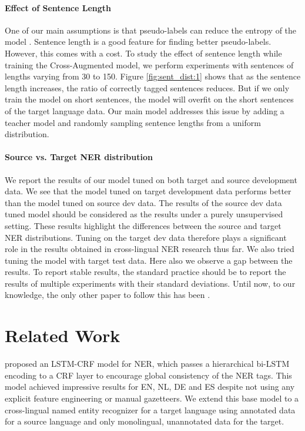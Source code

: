 \documentclass[letterpaper]{article} \usepackage{aaai20}  \usepackage{times}  \usepackage{helvet} \usepackage{courier}  \usepackage[hyphens]{url}  \usepackage{graphicx} \urlstyle{rm} \def\UrlFont{\rm}  \usepackage{graphicx}  \frenchspacing  \setlength{\pdfpagewidth}{8.5in}  \setlength{\pdfpageheight}{11in}
\newcommand{\citet}[1]{\citeauthor{#1} \shortcite{#1}}
\begin{document}
\paragraph{Effect of Sentence Length}
One of our main assumptions is that pseudo-labels can reduce the entropy of the model \cite{Entropy_min_bengio}. Sentence length is a good feature for finding better pseudo-labels. However, this comes with a cost. To study the effect of sentence length while training the Cross-Augmented model, we perform experiments with sentences of lengths varying from 30 to 150. Figure \ref{fig:sent_dist:1} shows that as the sentence length increases, the ratio of correctly tagged sentences reduces. But if we only train the model on short sentences, the model will overfit on the short sentences of the target language data. Our main model addresses this issue by adding a teacher model and randomly sampling sentence lengths from a uniform distribution.


\paragraph{Source vs. Target NER distribution}
 We report the results of our model tuned on both target and source development data. We see that the model tuned on target development data performs better than the model tuned on source dev data. The results of the source dev data tuned model should be considered as the results under a purely unsupervised setting. 
 These results highlight the differences between the source and target NER distributions. Tuning on the target dev data therefore plays a significant role in the results obtained in cross-lingual NER research thus far. 
 We also tried tuning the model with target test data. Here also we observe a gap between the results. To report stable results, the standard practice should be to report the results of multiple experiments with their standard deviations. Until now, to our knowledge, the only other paper to follow this has been \citet{cross-ling-cmu}. 



\section{Related Work}

 \citet{lampleNER} proposed an LSTM-CRF model for NER, which passes a hierarchical bi-LSTM encoding to a CRF layer to encourage global consistency of the NER tags. 
 This model achieved impressive results for EN, NL, DE and ES despite not using any explicit feature engineering or manual gazetteers. We extend this base model to a cross-lingual named entity recognizer for a target language using annotated data for a source language and only monolingual, unannotated data for the target. 
\end{document}
